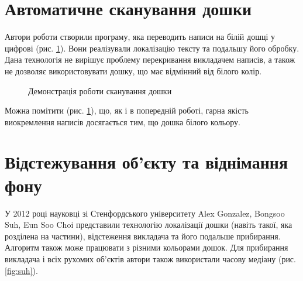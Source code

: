 \section{Автоматичне сканування дошки}
Автори роботи \cite{wienecke} створили програму, яка переводить написи на білій
дошці у цифрові (рис. \ref{fig:wienecke}). Вони реалізували локалізацію тексту та подальшу
його обробку. Дана технологія не вирішує проблему перекривання викладачем написів,
а також не дозволяє використовувати дошку, що має відмінний від білого колір.
\begin{figure}[H]
  \centering
  \caption{Демонстрація роботи сканування дошки \cite{wienecke}
    \label{fig:wienecke}
  }
\end{figure}
Можна помітити (рис. \ref{fig:wienecke}), що, як і в попередній роботі, гарна якість виокремлення написів
досягається тим, що дошка білого кольору.

\section{Відстежування об'єкту та віднімання фону}
У 2012 році науковці зі Стенфордського університету Alex Gonzalez,
Bongsoo Suh, Eun Soo Choi представили технологію \cite{suh} локалізації дошки
(навіть такої, яка розділена на частини), відстеження викладача та його
подальше прибирання. Алгоритм також може працювати з різними кольорами
дошок. Для прибирання викладача і всіх рухомих об'єктів автори також
використали часову медіану (рис. \ref{fig:suh}).

